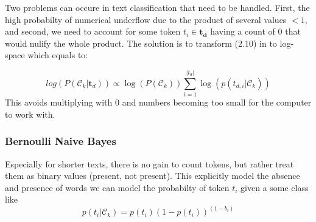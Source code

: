 Two problems can occure in text classification that need to be handled. First, the high probabilty of numerical underflow due to the product of several values $<1$, and second, we need to account for some token $t_i \in \boldsymbol{t_d}$ having a count of $0$ that would nulify the whole product. The solution is to transform (2.10) in to log-space which equals to:

$$log(P(\mathcal{C}_k|\boldsymbol{t}_d)) \propto \log(P(\mathcal{C}_k)) \sum_{i=1}^{|t_{d}|} \log({p(t_{d,i}|\mathcal{C}_k)})$$
This avoids multiplying with $0$ and numbers becoming too small for the computer to work with.

\subsubsection{Bernoulli Naive Bayes}
Especially for shorter texts, there is no gain to count tokens, but rather treat them as binary values (present, not present). This explicitly model the absence and presence of words we can model the probabilty of token $t_i$ given a some class like
\[p(t_{i}|\mathcal{C}_k) = p(t_{i})(1-p(t_{i}))^{(1-b_{i})}\]
